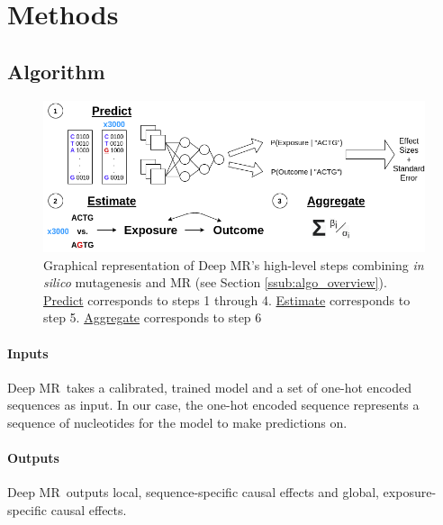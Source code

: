 \documentclass[twoside,11pt]{article}
\newcommand{\method}{{Deep MR}}
\begin{document}
\section{Methods}%
\label{sec:methods}

\subsection{Algorithm}%
\label{sub:algorithm}
\begin{figure}[htpb]
    \centering
    \includegraphics[width=.8\linewidth]{fig/model_overview.png}
    \vspace{-12pt}
    \caption{Graphical representation of \method's high-level steps combining \textit{in silico} mutagenesis and MR (see Section \ref{ssub:algo_overview}). \underline{Predict} corresponds to steps 1 through 4. \underline{Estimate} corresponds to step 5. \underline{Aggregate} corresponds to step 6}
    \vspace{-10pt}
    \label{fig:model_overview}
\end{figure}

\paragraph{Inputs}%
\label{par:inputs}
\method\ takes a calibrated, trained model and a set of one-hot encoded sequences as input. In our case, the one-hot encoded sequence represents a sequence of nucleotides for the model to make predictions on.

\paragraph{Outputs}%
\label{par:outputs}
\method\ outputs local, sequence-specific causal effects and global, exposure-specific causal effects. 
\end{document}
